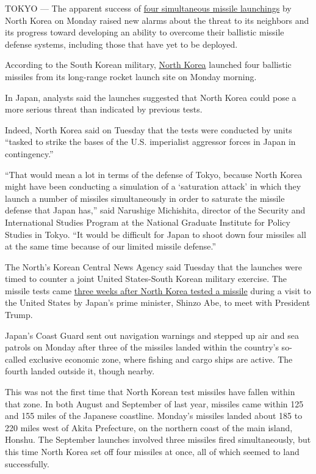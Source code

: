 TOKYO --- The apparent success of
\href{https://www.nytimes.com/2017/03/05/world/north-korea-ballistic-missiles.html?hp\&action=click\&pgtype=Homepage\&clickSource=story-heading\&module=second-column-region\&region=top-news\&WT.nav=top-news\&_r=0}{four
simultaneous missile launchings} by North Korea on Monday raised new
alarms about the threat to its neighbors and its progress toward
developing an ability to overcome their ballistic missile defense
systems, including those that have yet to be deployed.

According to the South Korean military,
\href{http://topics.nytimes.com/top/news/international/countriesandterritories/northkorea/index.html?inline=nyt-geo}{North
Korea} launched four ballistic missiles from its long-range rocket
launch site on Monday morning.

In Japan, analysts said the launches suggested that North Korea could
pose a more serious threat than indicated by previous tests.

Indeed, North Korea said on Tuesday that the tests were conducted by
units ``tasked to strike the bases of the U.S. imperialist aggressor
forces in Japan in contingency.''

``That would mean a lot in terms of the defense of Tokyo, because North
Korea might have been conducting a simulation of a `saturation attack'
in which they launch a number of missiles simultaneously in order to
saturate the missile defense that Japan has,'' said Narushige
Michishita, director of the Security and International Studies Program
at the National Graduate Institute for Policy Studies in Tokyo. ``It
would be difficult for Japan to shoot down four missiles all at the same
time because of our limited missile defense.''

The North's Korean Central News Agency said Tuesday that the launches
were timed to counter a joint United States-South Korean military
exercise. The missile tests came
\href{https://www.nytimes.com/2017/02/11/world/asia/north-korea-missile-test-trump.html}{three
weeks after North Korea tested a missile} during a visit to the United
States by Japan's prime minister, Shinzo Abe, to meet with President
Trump.

Japan's Coast Guard sent out navigation warnings and stepped up air and
sea patrols on Monday after three of the missiles landed within the
country's so-called exclusive economic zone, where fishing and cargo
ships are active. The fourth landed outside it, though nearby.

This was not the first time that North Korean test missiles have fallen
within that zone. In both August and September of last year, missiles
came within 125 and 155 miles of the Japanese coastline. Monday's
missiles landed about 185 to 220 miles west of Akita Prefecture, on the
northern coast of the main island, Honshu. The September launches
involved three missiles fired simultaneously, but this time North Korea
set off four missiles at once, all of which seemed to land successfully.

